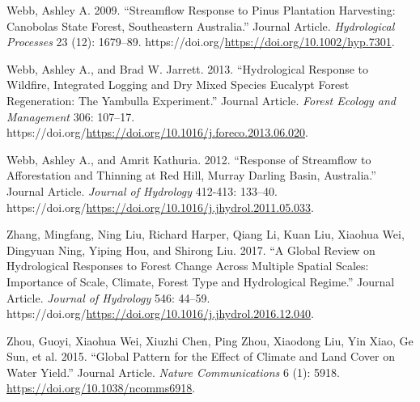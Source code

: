 \documentclass[]{elsarticle} %
\newlength{\cslhangindent}
\newlength{\cslentryspacingunit} %
\newenvironment{CSLReferences}[2] %
 {%
  \setlength{\parindent}{0pt}
  \ifodd #1
  \let\oldpar\par
  \def\par{\hangindent=\cslhangindent\oldpar}
  \fi
  \setlength{\parskip}{#2\cslentryspacingunit}
 }%
 {}
\begin{document}
\begin{CSLReferences}{1}{0}
\leavevmode{}%
Webb, Ashley A. 2009. {``Streamflow Response to Pinus Plantation Harvesting: Canobolas State Forest, Southeastern Australia.''} Journal Article. \emph{Hydrological Processes} 23 (12): 1679--89. https://doi.org/\url{https://doi.org/10.1002/hyp.7301}.

\leavevmode{}%
Webb, Ashley A., and Brad W. Jarrett. 2013. {``Hydrological Response to Wildfire, Integrated Logging and Dry Mixed Species Eucalypt Forest Regeneration: The Yambulla Experiment.''} Journal Article. \emph{Forest Ecology and Management} 306: 107--17. https://doi.org/\url{https://doi.org/10.1016/j.foreco.2013.06.020}.

\leavevmode{}%
Webb, Ashley A., and Amrit Kathuria. 2012. {``Response of Streamflow to Afforestation and Thinning at Red Hill, Murray Darling Basin, Australia.''} Journal Article. \emph{Journal of Hydrology} 412-413: 133--40. https://doi.org/\url{https://doi.org/10.1016/j.jhydrol.2011.05.033}.

\leavevmode{}%
Zhang, Mingfang, Ning Liu, Richard Harper, Qiang Li, Kuan Liu, Xiaohua Wei, Dingyuan Ning, Yiping Hou, and Shirong Liu. 2017. {``A Global Review on Hydrological Responses to Forest Change Across Multiple Spatial Scales: Importance of Scale, Climate, Forest Type and Hydrological Regime.''} Journal Article. \emph{Journal of Hydrology} 546: 44--59. https://doi.org/\url{https://doi.org/10.1016/j.jhydrol.2016.12.040}.

\leavevmode{}%
Zhou, Guoyi, Xiaohua Wei, Xiuzhi Chen, Ping Zhou, Xiaodong Liu, Yin Xiao, Ge Sun, et al. 2015. {``Global Pattern for the Effect of Climate and Land Cover on Water Yield.''} Journal Article. \emph{Nature Communications} 6 (1): 5918. \url{https://doi.org/10.1038/ncomms6918}.

\end{CSLReferences}
\end{document}
